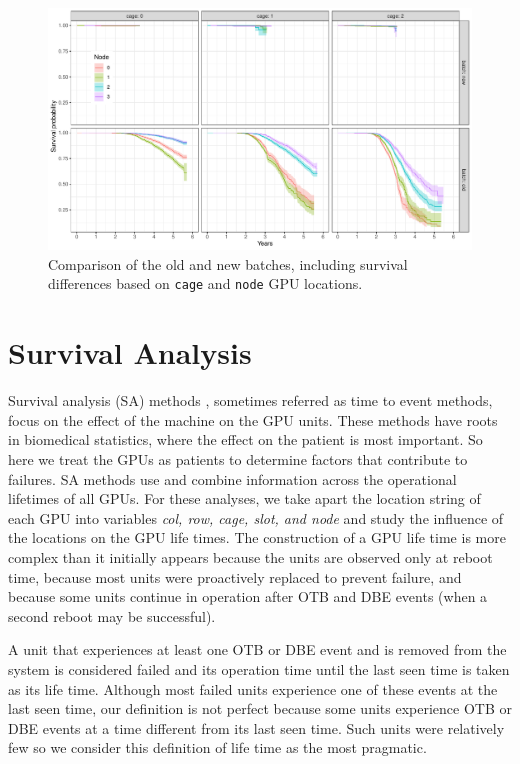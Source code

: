 \begin{figure}
  \centering
  \includegraphics[width=7in]{figs/km_cage-node_a001.pdf}
  \caption{Comparison of the old and new batches, including survival
    differences based on {\tt cage} and {\tt node} GPU locations.}
  \label{fig:km-all-cage-node}
\end{figure}
\section{Survival Analysis}
\label{section:survival}
\renewcommand{\pkg}[1]{\textsf{#1}} Survival analysis (SA) methods
\cite{survival-book}, 
sometimes referred as time to event methods, focus on the effect of
the machine on the GPU units. These methods have roots in biomedical
statistics, where the effect on the patient is most important. So here
we treat the GPUs as patients to determine factors that contribute to
failures. SA methods use and combine information across the
operational lifetimes of all GPUs. For these analyses,
we take apart the location string of each GPU into variables {\em col,
  row, cage, slot, and node} and study the influence of the locations
on the GPU life times. The construction of a GPU life time is more
complex than it initially appears because the units are observed only
at reboot time, because most units were proactively replaced to
prevent failure, and because some units continue in operation after
OTB and DBE events (when a second reboot may be successful).

A unit that experiences at least one OTB or DBE event and is removed
from the system is considered failed and its operation time until the
last seen time is taken as its life time. Although most failed units
experience one of these events at the last seen time, our definition
is not perfect because some units experience OTB or DBE events at a
time different from its last seen time. Such units were relatively few
so we consider this definition of life time as the most pragmatic.

